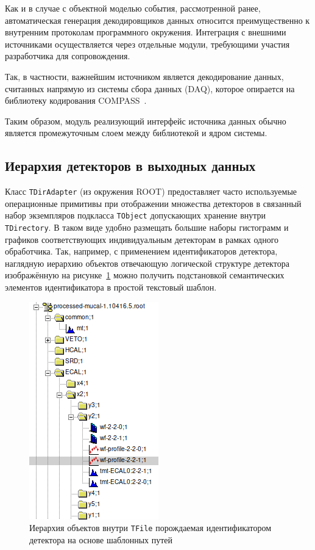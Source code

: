Как и в случае с объектной моделью события, рассмотренной ранее,
автоматическая генерация декодировщиков данных относится преимущественно
к внутренним протоколам программного окружения. Интеграция с внешними
источниками осуществляется через отдельные модули,
требующими участия разработчика для сопровождения.

Так, в частности, важнейшим источником является декодирование данных,
считанных напрямую из системы сбора данных (DAQ), которое опирается
на библиотеку кодирования COMPASS~\cite{compass-daq}.

Таким образом, модуль реализующий интерфейс источника данных обычно
является промежуточным слоем между библиотекой и ядром системы.

\subsection{Иерархия детекторов в выходных данных}

Класс \texttt{TDirAdapter} (из окружения ROOT) предоставляет
часто используемые операционные примитивы при отображении
множества детекторов в связанный
набор экземпляров подкласса \texttt{TObject} допускающих
хранение внутри \texttt{TDirectory}. В таком виде удобно
размещать большие наборы гистограмм и
графиков соответствующих индивидуальным детекторам в рамках одного
обработчика. Так, например, с применением идентификаторов детектора,
наглядную иерархию объектов отвечающую
логической структуре детектора изображённую на
рисунке~\ref{fig:tobject-hierarchy} можно получить подстановкой
семантических элементов идентификатора в простой текстовый шаблон.

\begin{figure}
    \centering
    \includegraphics[width=0.25\linewidth]{images//illustrative/items-structure-in-root-file.png}
    \caption{Иерархия объектов внутри \texttt{TFile} порождаемая
    идентификатором детектора на основе шаблонных путей}
    \label{fig:tobject-hierarchy}
\end{figure}


